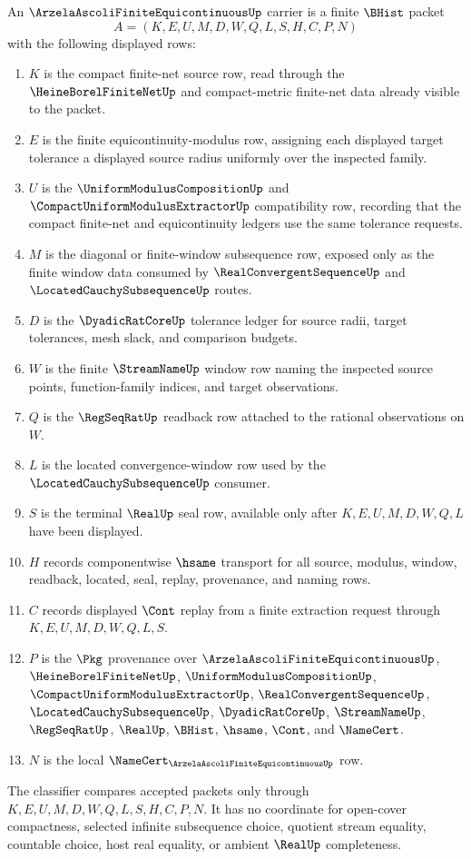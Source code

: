 \begin{definition}
\label{def:arzela-ascoli-finite-equicontinuous-carrier}
An $\ArzelaAscoliFiniteEquicontinuousUp$ carrier is a finite $\BHist$ packet
$$
A=(K,E,U,M,D,W,Q,L,S,H,C,P,N)
$$
with the following displayed rows:
\begin{enumerate}
\item $K$ is the compact finite-net source row, read through the $\HeineBorelFiniteNetUp$ and compact-metric finite-net data already visible to the packet.
\item $E$ is the finite equicontinuity-modulus row, assigning each displayed target tolerance a displayed source radius uniformly over the inspected family.
\item $U$ is the $\UniformModulusCompositionUp$ and $\CompactUniformModulusExtractorUp$ compatibility row, recording that the compact finite-net and equicontinuity ledgers use the same tolerance requests.
\item $M$ is the diagonal or finite-window subsequence row, exposed only as the finite window data consumed by $\RealConvergentSequenceUp$ and $\LocatedCauchySubsequenceUp$ routes.
\item $D$ is the $\DyadicRatCoreUp$ tolerance ledger for source radii, target tolerances, mesh slack, and comparison budgets.
\item $W$ is the finite $\StreamNameUp$ window row naming the inspected source points, function-family indices, and target observations.
\item $Q$ is the $\RegSeqRatUp$ readback row attached to the rational observations on $W$.
\item $L$ is the located convergence-window row used by the $\LocatedCauchySubsequenceUp$ consumer.
\item $S$ is the terminal $\RealUp$ seal row, available only after $K,E,U,M,D,W,Q,L$ have been displayed.
\item $H$ records componentwise $\hsame$ transport for all source, modulus, window, readback, located, seal, replay, provenance, and naming rows.
\item $C$ records displayed $\Cont$ replay from a finite extraction request through $K,E,U,M,D,W,Q,L,S$.
\item $P$ is the $\Pkg$ provenance over $\ArzelaAscoliFiniteEquicontinuousUp$, $\HeineBorelFiniteNetUp$, $\UniformModulusCompositionUp$, $\CompactUniformModulusExtractorUp$, $\RealConvergentSequenceUp$, $\LocatedCauchySubsequenceUp$, $\DyadicRatCoreUp$, $\StreamNameUp$, $\RegSeqRatUp$, $\RealUp$, $\BHist$, $\hsame$, $\Cont$, and $\NameCert$.
\item $N$ is the local $\NameCert_{\ArzelaAscoliFiniteEquicontinuousUp}$ row.
\end{enumerate}
The classifier compares accepted packets only through $K,E,U,M,D,W,Q,L,S,H,C,P,N$. It has no coordinate for open-cover compactness, selected infinite subsequence choice, quotient stream equality, countable choice, host real equality, or ambient $\RealUp$ completeness.
\end{definition}

